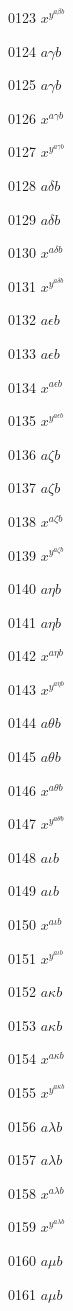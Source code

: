 \documentclass{article}
\begin{document}
0123 $x^{y^{a\beta b}}$\par
0124 $a\gamma b$\par
0125 $\displaystyle a\gamma b$\par
0126 $x^{a\gamma b}$\par
0127 $x^{y^{a\gamma b}}$\par
0128 $a\delta b$\par
0129 $\displaystyle a\delta b$\par
0130 $x^{a\delta b}$\par
0131 $x^{y^{a\delta b}}$\par
0132 $a\epsilon b$\par
0133 $\displaystyle a\epsilon b$\par
0134 $x^{a\epsilon b}$\par
0135 $x^{y^{a\epsilon b}}$\par
0136 $a\zeta b$\par
0137 $\displaystyle a\zeta b$\par
0138 $x^{a\zeta b}$\par
0139 $x^{y^{a\zeta b}}$\par
0140 $a\eta b$\par
0141 $\displaystyle a\eta b$\par
0142 $x^{a\eta b}$\par
0143 $x^{y^{a\eta b}}$\par
0144 $a\theta b$\par
0145 $\displaystyle a\theta b$\par
0146 $x^{a\theta b}$\par
0147 $x^{y^{a\theta b}}$\par
0148 $a\iota b$\par
0149 $\displaystyle a\iota b$\par
0150 $x^{a\iota b}$\par
0151 $x^{y^{a\iota b}}$\par
0152 $a\kappa b$\par
0153 $\displaystyle a\kappa b$\par
0154 $x^{a\kappa b}$\par
0155 $x^{y^{a\kappa b}}$\par
0156 $a\lambda b$\par
0157 $\displaystyle a\lambda b$\par
0158 $x^{a\lambda b}$\par
0159 $x^{y^{a\lambda b}}$\par
0160 $a\mu b$\par
0161 $\displaystyle a\mu b$\par
\end{document}
